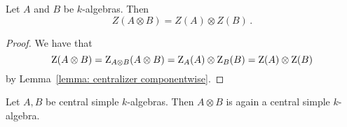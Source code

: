 \begin{corollary}
  \label{corollary: center of tensor product}
  Let $A$ and $B$ be $k$-algebras.
  Then
  \[
      Z(A \otimes B)
    = Z(A) \otimes Z(B) \,.
  \]
\end{corollary}


\begin{proof}
  We have that
  \[
      \operatorname{Z}(A \otimes B)
    = \operatorname{Z}_{A \otimes B}(A \otimes B)
    = \operatorname{Z}_A(A) \otimes \operatorname{Z}_B(B)
    = \operatorname{Z}(A) \otimes \operatorname{Z}(B)
  \]
  by Lemma~\ref{lemma: centralizer componentwise}.
\end{proof}


\begin{proposition}
  Let $A, B$ be central simple $k$-algebras.
  Then $A \otimes B$ is again a central simple $k$-algebra.
\end{proposition}


